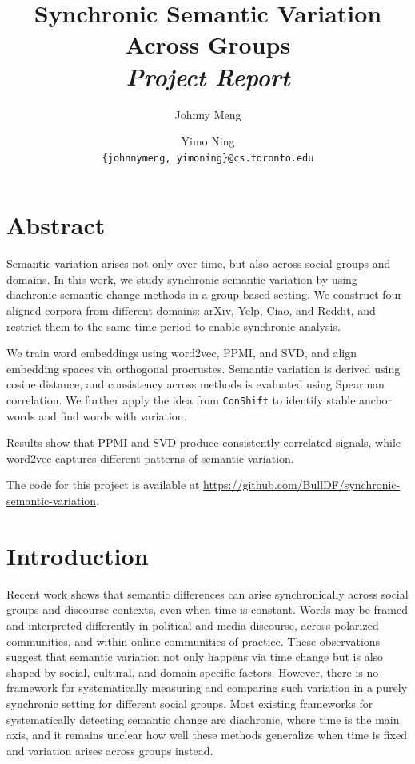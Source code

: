 \documentclass[11pt]{article}
\title{
{Synchronic Semantic Variation Across Groups}\\[0.2em]
\large \textit{Project Report} \\[-1em]
}
\author{
  Johnny Meng \and Yimo Ning \\
  \texttt{\{johnnymeng, yimoning\}@cs.toronto.edu}
}
\begin{document}
\maketitle

\section*{Abstract}

Semantic variation arises not only over time, but also across social groups and domains. In this work, we study synchronic semantic variation by using diachronic semantic change methods in a group-based setting. We construct four aligned corpora from different domains: arXiv, Yelp, Ciao, and Reddit, and restrict them to the same time period to enable synchronic analysis. 

We train word embeddings using word2vec, PPMI, and SVD, and align embedding spaces via orthogonal procrustes. Semantic variation is derived using cosine distance, and consistency across methods is evaluated using Spearman correlation. We further apply the idea from \texttt{ConShift} to identify stable anchor words and find words with variation.

Results show that PPMI and SVD produce consistently correlated signals, while word2vec captures different patterns of semantic variation.

The code for this project is available at \url{https://github.com/BullDF/synchronic-semantic-variation}.

\section{Introduction}

Recent work shows that semantic differences can arise synchronically across social groups and discourse contexts, even when time is constant. Words may be framed and interpreted differently in political and media discourse, across polarized communities, and within online communities of practice. These observations suggest that semantic variation not only happens via time change but is also shaped by social, cultural, and domain-specific factors. However, there is no framework for systematically measuring and comparing such variation in a purely synchronic setting for different social groups. Most existing frameworks for systematically detecting semantic change are diachronic, where time is the main axis, and it remains unclear how well these methods generalize when time is fixed and variation arises across groups instead.
\end{document}
